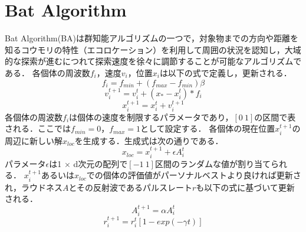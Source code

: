 \documentclass[twocolumn, a4paper]{UECIEresume}
\begin{document}
\section{Bat Algorithm}
Bat Algorithm(BA)は群知能アルゴリズムの一つで，対象物までの方向や距離を知るコウモリの特性（エコロケーション）を利用して周囲の状況を認知し，大域的な探索が進むにつれて探索速度を徐々に調節することが可能なアルゴリズムである\cite{BA}．
各個体の周波数${f_i}$，速度${v_i}$，位置${x_i}$は以下の式で定義し，更新される．
\begin{equation}
f_{i} =f_{min}+(f_{max}-f_{min}) \beta
\label{eq:freq} 
\end{equation}
\begin{equation}
v_i^{t+1}=v_i^{t}+(x_*-x_i^t)* f_i
\label{eq:vel}
\end{equation}
\begin{equation}
x_i^{t+1}=x_i^{t}+v_i^{t+1}
\label{eq:xi}
\end{equation}
各個体の周波数${f_i}$は個体の速度を制限するパラメータであり，$[0 \ 1]$の区間で表される．ここでは${f_{min}=0}$，${f_{max}=1}$として設定する．
各個体の現在位置${x_i^{t+1}}$の周辺に新しい解${x_{loc}}$を生成する．生成式は次の通りである．
\begin{equation}
\label{eq:loc}
x_{loc}=x_i^{t+1} + \epsilon A_i^t
\end{equation}
パラメータ$\epsilon$は1 $\times$ d次元の配列で$[-1 \ 1]$区間のランダムな値が割り当てられる． ${x_i^{t+1}}$あるいは${x_{loc}}$での個体の評価値がパーソナルベストより良ければ更新され，ラウドネス$A$とその反射波であるパルスレート$r$も以下の式に基づいて更新される．
\begin{equation}
\label{eq:loud}
A_i^{t+1}= \alpha A_i^t
\end{equation}
\begin{equation}
\label{eq:pulse}
r_i^{t+1}=r_i^t[1-exp(- \gamma t)]
\end{equation}
\end{document}
